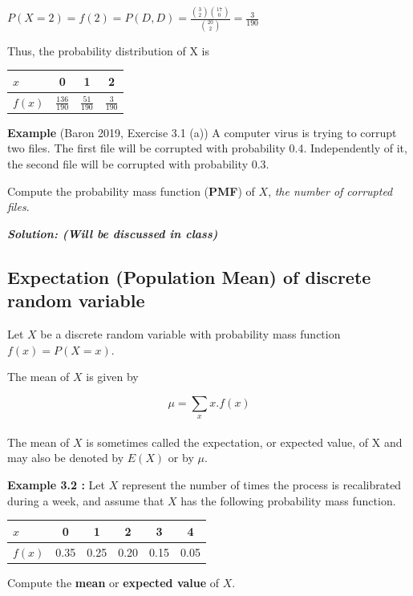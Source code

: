 \documentclass[
  11pt,
  letterpaper,
  DIV=11,
  numbers=noendperiod]{scrreprt}
\begin{document}
\(P(X=2)=f(2)=P(D,D)=\frac{\binom{3}{2}\binom{17}{0}}{\binom{20}{2}}=\frac{3}{190}\)

Thus, the probability distribution of X is

\begin{longtable}[]{@{}lccc@{}}
\toprule\noalign{}
\(x\) & 0 & 1 & 2 \\
\midrule\noalign{}
\endhead
\bottomrule\noalign{}
\endlastfoot
\(f(x)\) & \(\frac{136}{190}\) & \(\frac{51}{190}\) &
\(\frac{3}{190}\) \\
\end{longtable}

\textbf{Example} (Baron 2019, Exercise 3.1 (a)) A computer virus is
trying to corrupt two files. The first file will be corrupted with
probability 0.4. Independently of it, the second file will be corrupted
with probability 0.3.

Compute the probability mass function (\textbf{PMF}) of \(X\), \emph{the
number of corrupted files}.

\textbf{\emph{Solution: (Will be discussed in class)}}

\subsection{Expectation (Population Mean) of discrete random
variable}\label{expectation-population-mean-of-discrete-random-variable}

Let \(X\) be a discrete random variable with probability mass function
\(f(x) = P(X = x)\).

The mean of \(X\) is given by

\[\mu=\sum_x x.f(x)\]\\
The mean of \(X\) is sometimes called the expectation, or expected
value, of X and may also be denoted by \(E(X)\) or by \(\mu\).

\textbf{Example 3.2 :} Let \(X\) represent the number of times the
process is recalibrated during a week, and assume that \(X\) has the
following probability mass function.

\begin{longtable}[]{@{}lccccc@{}}
\toprule\noalign{}
\(x\) & 0 & 1 & 2 & 3 & 4 \\
\midrule\noalign{}
\endhead
\bottomrule\noalign{}
\endlastfoot
\(f(x)\) & 0.35 & 0.25 & 0.20 & 0.15 & 0.05 \\
\end{longtable}

Compute the \textbf{mean} or \textbf{expected value} of \(X\).
\end{document}
